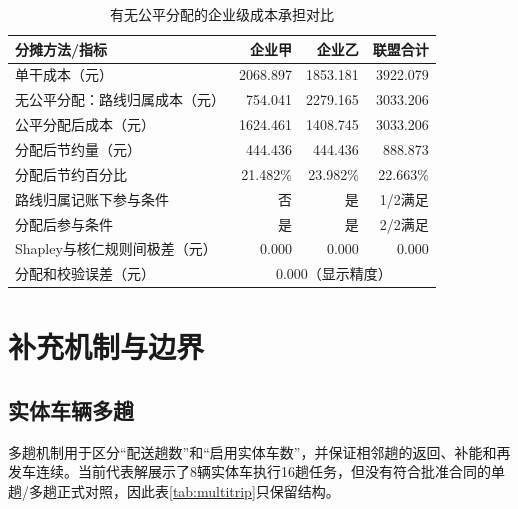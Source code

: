 \documentclass{setp-new}
\begin{document}
\begin{table}[htbp]
  \centering
  \caption{有无公平分配的企业级成本承担对比}
  \label{tab:allocation}
  \small
  \begin{tabular}{lrrr}
    \toprule
    分摊方法/指标 & 企业甲 & 企业乙 & 联盟合计\\
    \midrule
    单干成本（元） & 2068.897 & 1853.181 & 3922.079\\
    无公平分配：路线归属成本（元） & 754.041 & 2279.165 & 3033.206\\
    公平分配后成本（元） & 1624.461 & 1408.745 & 3033.206\\
    分配后节约量（元） & 444.436 & 444.436 & 888.873\\
    分配后节约百分比 & 21.482\% & 23.982\% & 22.663\%\\
    路线归属记账下参与条件 & 否 & 是 & 1/2满足\\
    分配后参与条件 & 是 & 是 & 2/2满足\\
    Shapley与核仁规则间极差（元） & 0.000 & 0.000 & 0.000\\
    分配和校验误差（元） & \multicolumn{3}{c}{0.000（显示精度）}\\
    \bottomrule
  \end{tabular}
\end{table}

\section{补充机制与边界}

\subsection{实体车辆多趟}

多趟机制用于区分“配送趟数”和“启用实体车数”，并保证相邻趟的返回、补能和再发车连续。当前代表解展示了8辆实体车执行16趟任务，但没有符合批准合同的单趟/多趟正式对照，因此表\ref{tab:multitrip}只保留结构。
\end{document}
